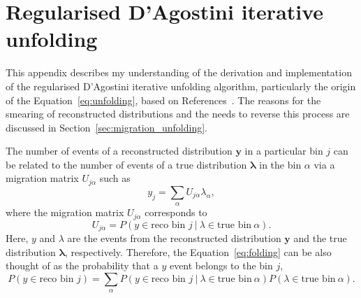 \chapter{Regularised D'Agostini iterative unfolding}

\label{ch:appendix_unfolding}

This appendix describes my understanding of the derivation and implementation of the regularised D'Agostini iterative unfolding algorithm, particularly the origin of the Equation~\ref{eq:unfolding}, based on References~\cite{DAgostini:1994fjx,DAgostini:2010hil,KuuselaThesis2016}. The reasons for the smearing of reconstructed distributions and the needs to reverse this process are discussed in Section~\ref{sec:migration_unfolding}.

The number of events of a reconstructed distribution $\boldsymbol{y}$ in a particular bin $j$ can be related to the number of events of a true distribution $\boldsymbol{\lambda}$ in the bin $\alpha$ via a migration matrix $U_{j\alpha}$ such as
\begin{equation}
    \label{eq:folding}
    y_{j} = \sum_{\alpha} U_{j\alpha}\lambda_{\alpha},
\end{equation}
where the migration matrix $U_{j\alpha}$ corresponds to
\begin{equation}
    \label{eq:migration}
    U_{j\alpha} = P(y \in \text{reco bin } j~|~\lambda \in \text{true bin}~\alpha).
\end{equation}
Here, $y$ and $\lambda$ are the events from the reconstructed distribution $\boldsymbol{y}$ and the true distribution $\boldsymbol{\lambda}$, respectively. Therefore, the Equation~\ref{eq:folding} can be also thought of as the probability that a $y$ event belongs to the bin $j$,
\begin{equation}
    \label{eq:yDistribution}
    P(y \in \text{reco bin } j) = \sum_{\alpha} P(y \in \text{reco bin } j~|~\lambda \in \text{true bin}~\alpha)  P(\lambda \in \text{true bin}~\alpha) .
\end{equation}

